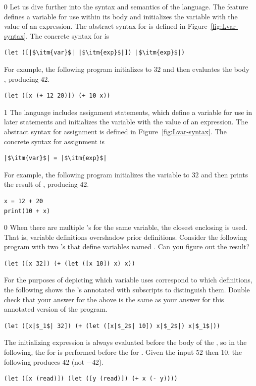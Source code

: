 \documentclass[7x10,nocrop]{TimesAPriori_MIT}%
\def\racketEd{0}
\def\pythonEd{1}
\def\edition{1}
\begin{document}
{\if\edition\racketEd
Let us dive further into the syntax and semantics of the \LangVar{}
language.  The  feature defines a variable for use within its
body and initializes the variable with the value of an expression.
The abstract syntax for  is defined in
Figure~\ref{fig:Lvar-syntax}.  The concrete syntax for  is
\begin{lstlisting}
(let ([|$\itm{var}$| |$\itm{exp}$|]) |$\itm{exp}$|)
\end{lstlisting}
For example, the following program initializes  to $32$ and then
evaluates the body , producing $42$.
\begin{lstlisting}
(let ([x (+ 12 20)]) (+ 10 x))
\end{lstlisting}
\fi}
%
{\if\edition\pythonEd
%
The \LangVar{} language includes assignment statements, which define a
variable for use in later statements and initializes the variable with
the value of an expression.  The abstract syntax for assignment is
defined in Figure~\ref{fig:Lvar-syntax}.  The concrete syntax for
assignment is
\begin{lstlisting}
|$\itm{var}$| = |$\itm{exp}$|
\end{lstlisting}
For example, the following program initializes the variable 
to $32$ and then prints the result of , producing $42$.
\begin{lstlisting}
x = 12 + 20
print(10 + x)
\end{lstlisting}
\fi}

{\if\edition\racketEd
%  
When there are multiple 's for the same variable, the closest
enclosing  is used. That is, variable definitions overshadow
prior definitions. Consider the following program with two 's
that define variables named . Can you figure out the result?
\begin{lstlisting}
(let ([x 32]) (+ (let ([x 10]) x) x))
\end{lstlisting}
For the purposes of depicting which variable uses correspond to which
definitions, the following shows the 's annotated with
subscripts to distinguish them. Double check that your answer for the
above is the same as your answer for this annotated version of the
program.
\begin{lstlisting}
(let ([x|$_1$| 32]) (+ (let ([x|$_2$| 10]) x|$_2$|) x|$_1$|))
\end{lstlisting}
The initializing expression is always evaluated before the body of the
, so in the following, the  for  is
performed before the  for . Given the input
$52$ then $10$, the following produces $42$ (not $-42$).
\begin{lstlisting}
(let ([x (read)]) (let ([y (read)]) (+ x (- y))))
\end{lstlisting}
\fi}
\end{document}
